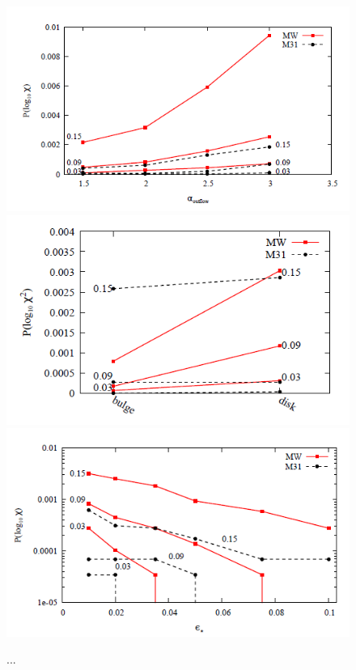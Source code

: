 \documentclass[useAMS,usenatbib]{mn2e}
\begin{document}
\begin{figure}
 \includegraphics[scale=0.4,angle=0]{figures/fig6_old.png}
 \includegraphics[scale=0.4,angle=0]{figures/fig7_old.png}
 \includegraphics[scale=0.4,angle=0]{figures/fig8_old.png}
\caption{...}
\label{fig:fded}
\end{figure}
\end{document}
